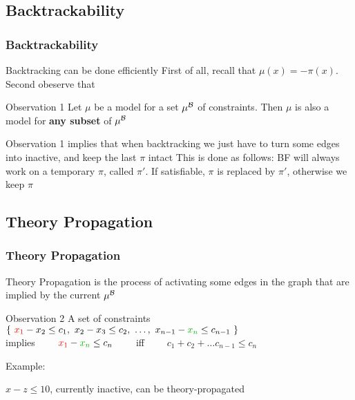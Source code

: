 \subsection{Backtrackability}

\begin{frame}
  \frametitle{Backtrackability}

  Backtracking can be done efficiently
  \vfill
  First of all, recall that $\mu(x) = -\pi(x)$. Second obeserve that
  \vfill
  \begin{exampleblock}{Observation 1}
    Let $\mu$ be a model for a set $\mu^{\mathcal{B}}$ of constraints.
    Then $\mu$ is also a model for {\bf any subset} of $\mu^{\mathcal{B}}$
  \end{exampleblock}
  \vfill
  Observation 1 implies that when backtracking we just have to turn some
  edges into inactive, and keep the last $\pi$ intact
  \vfill
  This is done as follows: BF will always work on a temporary $\pi$, called $\pi'$. If satisfiable,
  $\pi$ is replaced by $\pi'$, otherwise we keep $\pi$  

\end{frame}

\subsection{Theory Propagation}

\begin{frame}
  \frametitle{Theory Propagation}

  Theory Propagation is the process of activating some edges in the
  graph that are implied by the current $\mu^{\mathcal{B}}$
  \vfill
  \begin{exampleblock}{Observation 2}
    A set of constraints \\
    $\{\ \colone{x_1} - x_2 \leq c_1,\ x_2 - x_3 \leq c_2,\ \ldots,\ x_{n-1} - \coltwo{x_n} \leq c_{n-1}\ \}$ \\
    implies 
    $\quad\quad\colone{x_1} - \coltwo{x_n} \leq c_n\quad\quad$ 
    iff 
    $\quad\quad c_1 + c_2 + \ldots c_{n-1} \leq c_n$
  \end{exampleblock}
  \vfill
  \pause
  Example:

  \begin{center}
     
  \end{center}

  $x - z \leq 10$, currently inactive, can be theory-propagated

\end{frame}
